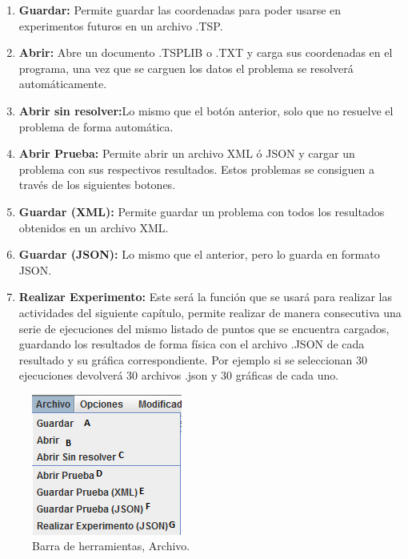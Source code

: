 \begin{enumerate}[label=\Alph*.-]
\item \textbf{Guardar:} Permite guardar las coordenadas para poder usarse en experimentos futuros en un archivo .TSP.
\item \textbf{Abrir:} Abre un documento .TSPLIB o .TXT y carga sus coordenadas en el programa, una vez que se carguen los datos el problema se resolverá automáticamente.
\item \textbf{Abrir sin resolver:}Lo mismo que el botón anterior, solo que no resuelve el problema de forma automática.
\item \textbf{Abrir Prueba:} Permite abrir un archivo XML ó JSON y cargar un problema con sus respectivos resultados. Estos problemas se consiguen a través de los siguientes botones.
\item \textbf{Guardar (XML):} Permite guardar un problema con todos los resultados obtenidos en un archivo XML.
\item \textbf{Guardar (JSON):} Lo mismo que el anterior, pero lo guarda en formato JSON.
\item \textbf{Realizar Experimento:} Este será la función que se usará para realizar las actividades del siguiente capítulo, permite realizar de manera consecutiva una serie de ejecuciones del mismo listado de puntos que se encuentra cargados, guardando los resultados de forma física con el archivo .JSON de cada resultado y su gráfica correspondiente. Por ejemplo si se seleccionan 30 ejecuciones devolverá 30 archivos .json y 30 gráficas de cada uno.
\end{enumerate}

     \begin{figure}[hbtp]
        \centering
            \includegraphics{Software/Imagenes/Software_4.png}
            \caption{Barra de herramientas, Archivo.}
            \label{fig:Software_4}
    \end{figure}
    
